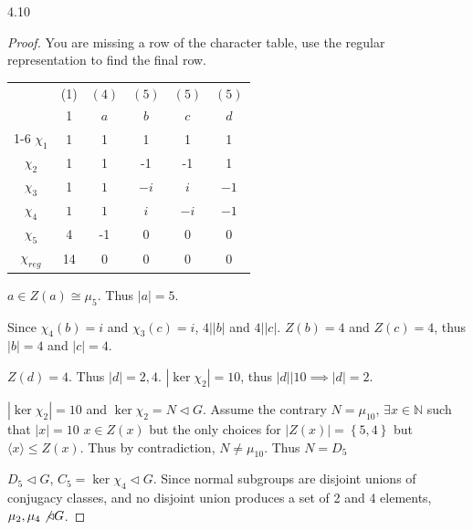 \documentclass{article}
\newcommand{\N}{\mathbb{N}}
\newcommand{\angles}[1]{\langle #1 \rangle}
\begin{document}
\begin{PROB}{4.10}\label{Problem 4.10.}
\end{PROB}
\begin{proof}
    You are missing a row of the character table, use the regular representation to find the final row.

    \begin{tabular}{c | c c c c c }
        & (1) & $(4)$ & $(5)$ & $(5)$ & $(5)$  \\
        & 1 & $a$ & $b$ & $c$ & $d$  \\
        \cline{1-6}
        $\chi_1$ & 1 & 1 & 1 & 1 & 1 \\
        $\chi_2$ & 1 & 1 & -1 & -1 & 1 \\
        $\chi_3$ & 1 & $1$ & $-i$ & $i$ & $-1$ \\
        $\chi_4$ & $1$ & $1$ & $i$ & $-i$ & $-1$ \\
        $\chi_5$ & 4 & -1 & 0 & 0 & 0 \\
        $\chi_{reg}$ & 14 & 0 & 0 & 0 & 0 
    \end{tabular}

    $a \in Z(a) \cong \mu_5$. Thus $|a| = 5$.
    
    Since $\chi_4(b) = i$ and $\chi_3(c) = i$, $4 | |b|$ and $4 | |c|$. $Z(b) = 4$ and $Z(c) = 4$, thus $|b| = 4$ and $|c| = 4$. 
    
    $Z(d) = 4$. Thus $|d| = 2, 4$. $|\ker \chi_2| = 10$, thus $|d| | 10 \implies |d| = 2$.
    
    
    $|\ker \chi_2| = 10$ and $\ker \chi_2 = N \triangleleft G$. Assume the contrary $N = \mu_{10}$, $\exists x \in \N$ such that $|x| = 10$ $x \in Z(x)$ but the only choices for $|Z(x)| = \left\{ 5, 4 \right\}$ but $\angles{x} \leq Z(x)$. Thus by contradiction, $N \neq \mu_{10}$. Thus $N = D_5$
    
    $D_5 \triangleleft G$, $C_5 = \ker \chi_4 \triangleleft G$. Since normal subgroups are disjoint unions of conjugacy classes, and no disjoint union produces a set of 2 and 4 elements, $\mu_2, \mu_4 \not \triangleleft G$. 
\end{proof}

\bigskip
\end{document}
